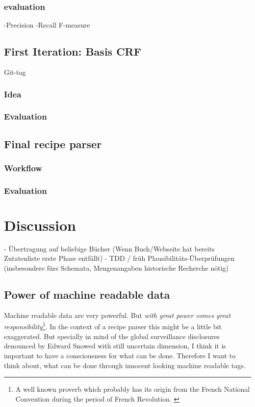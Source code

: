\documentclass[12pt, twoside]{report}
\begin{document}
\subsection{evaluation}
-Precision -Recall F-measure

\section{First Iteration: Basis CRF}
Git-tag
\subsection{Idea}
\subsection{Evaluation}

\section{Final recipe parser}
\subsection{Workflow}
\subsection{Evaluation}

\chapter{Discussion}
- Übertragung auf beliebige Bücher (Wenn Buch/Webseite hat bereits Zutatenliste erste Phase entfällt)
- TDD / früh Plausibilitäts-Überprüfungen (insbesondere fürs Schemata, Mengenangaben historische Recherche nötig)

\section{Power of machine readable data}
Machine readable data are very powerful. But \textit{with great power comes great responsibility}\footnote{A well known proverb which probably has its origin from the French National Convention during the period of French Revolution. \parencite{quoteInvestigator}}. In the context of a recipe parser this might be a little bit exaggerated. But specially in mind of the global surveillance disclosures denounced by Edward Snowed with still uncertain dimension, I think it is important to have a consciousness for what can be done. Therefore I want to think about, what can be done through innocent looking machine readable tags. 
\bigskip
\end{document}

